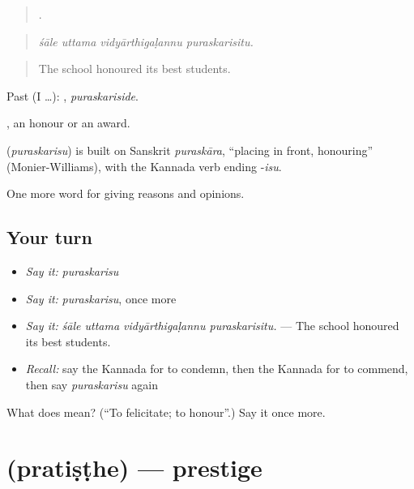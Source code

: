\begin{quote}
   .
\end{quote}

\begin{quote}
\emph{śāle uttama vidyārthigaḷannu puraskarisitu.}
\end{quote}

\begin{quote}
The school honoured its best students.
\end{quote}

Past (I …): , \emph{puraskariside}.

, an honour or an award.

\begin{cousinweb}
\textbf{} (\emph{puraskarisu}) is built on Sanskrit \emph{puraskāra}, \textquotedblleft{}placing in front, honouring\textquotedblright{} (Monier-Williams), with the Kannada verb ending -\emph{isu}.
\end{cousinweb}

\begin{grammarlens}[title={What you've built}]
One more word for giving reasons and opinions.
\end{grammarlens}

\subsection*{Your turn}
\begin{itemize}
\raggedright
  \item \emph{Say it:} \emph{puraskarisu}
  \item \emph{Say it:} \emph{puraskarisu}, once more
  \item \emph{Say it:} \emph{śāle uttama vidyārthigaḷannu puraskarisitu.} — The school honoured its best students.
  \item \emph{Recall:} say the Kannada for to condemn, then the Kannada for to commend, then say \emph{puraskarisu} again
\end{itemize}

\begin{tcolorbox}[breakable,colback=teal!4,colframe=teal!35!black,title={Before you move on}]
What does  mean? (\textquotedblleft{}To felicitate; to honour\textquotedblright{}.) Say it once more.
\end{tcolorbox}
\section[\texorpdfstring{\kn{ಪ್ರತಿಷ್ಠೆ} (pratiṣṭhe)}{ಪ್ರತಿಷ್ಠೆ (pratiṣṭhe)}]{ (pratiṣṭhe) — prestige}

